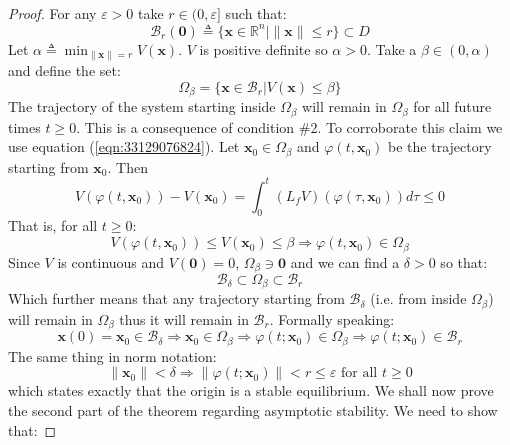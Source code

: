 \documentclass[a4paper,10pt,oneside]{book}
\begin{document}
\begin{proof}
 For any $\varepsilon>0$ take $r\in (0,\varepsilon]$ such that:
\begin{equation}
 \mathcal{B}_r(\mathbf{0})\triangleq \{\mathbf{x}\in\mathbb{R}^n | \|\mathbf{x}\|\leq r \}\subset D
\end{equation}
Let $\alpha\triangleq \min_{\|\mathbf{x}\|=r}V(\mathbf{x})$. $V$ is positive definite so $\alpha>0$. Take a $\beta \in (0,\alpha)$ and define the set:
\begin{equation}
 \Omega_\beta = \{\mathbf{x}\in \mathcal{B}_r | V(\mathbf{x}) \leq \beta \}
\end{equation}
The trajectory of the system starting inside $\Omega_\beta$ will remain in $\Omega_\beta$ for all future times $t\geq 0$. This is a consequence of condition \#2. To corroborate this claim we use equation (\ref{eqn:33129076824}). Let $\mathbf{x}_0 \in \Omega_\beta$ and $\varphi(t,\mathbf{x}_0)$ be the trajectory starting from $\mathbf{x}_0$. Then
\begin{equation}
 V\left( \varphi\left( t,\mathbf{x}_0\right) \right)-V(\mathbf{x}_0)=\int_0^t \left( L_fV\right) \left( \varphi(\tau,\mathbf{x}_0)\right) d\tau\leq 0
\end{equation}
That is, for all $t\geq 0$:
\begin{equation}
 V(\varphi(t,\mathbf{x}_0))\leq V(\mathbf{x}_0)\leq \beta \Rightarrow\varphi(t,\mathbf{x}_0)\in\Omega_\beta 
\end{equation}
Since $V$ is continuous and $V(\mathbf{0})=0$, $\Omega_\beta\ni\mathbf{0}$ and we can find a $\delta>0$ so that:
\begin{equation}
 \mathcal{B}_\delta \subset \Omega_\beta \subset \mathcal{B}_r
\end{equation}
Which further means that any trajectory starting from $\mathcal{B}_\delta$ (i.e. from inside $\Omega_\beta$) will remain in $\Omega_\beta$ thus it will remain in $\mathcal{B}_r$. Formally speaking:
\begin{equation}
 \mathbf{x}(0)=\mathbf{x}_0 \in \mathcal{B}_\delta \Rightarrow \mathbf{x}_0 \in \Omega_\beta \Rightarrow \varphi(t;\mathbf{x}_0) \in \Omega_\beta
\Rightarrow \varphi(t;\mathbf{x}_0) \in \mathcal{B}_r
\end{equation}
The same thing in norm notation:
\begin{equation}
 \|\mathbf{x}_0\|<\delta \Rightarrow \|\varphi(t;\mathbf{x}_0)\| < r \leq \varepsilon \text{ for all } t\geq 0
\end{equation}
which states exactly that the origin is a stable equilibrium. We shall now prove the second part of the theorem regarding asymptotic stability. We need to show that:

\end{proof}
\end{document}
